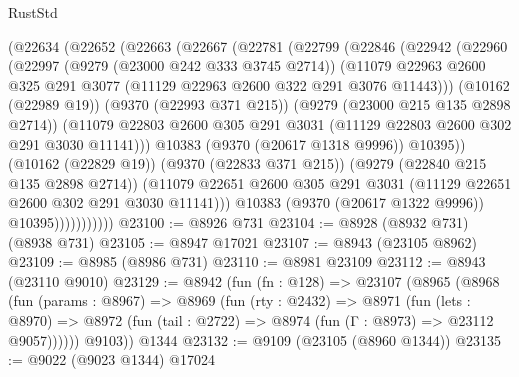 \begin{lexlean}{RustStd}
\begin{coremodule}
{\begin{coremodule}
{{{{{{{{{{{{{{{{{{{{{{{{{{{{{{{{{{{{{{{                (@22634
                  (@22652
                    (@22663
                      (@22667
                        (@22781
                          (@22799
                            (@22846
                              (@22942
                                (@22960
                                  (@22997
                                    (@9279 (@23000 @242 @333 @3745 @2714))
                                    (@11079
                                      @22963
                                      @2600
                                      @325
                                      @291
                                      @3077
                                      (@11129 @22963 @2600 @322 @291 @3076 @11443)))
                                  (@10162 (@22989 @19))
                                  (@9370 (@22993 @371 @215))
                                  (@9279 (@23000 @215 @135 @2898 @2714))
                                  (@11079
                                    @22803
                                    @2600
                                    @305
                                    @291
                                    @3031
                                    (@11129 @22803 @2600 @302 @291 @3030 @11141)))
                                @10383
                                (@9370 (@20617 @1318 @9996))
                                @10395))
                            (@10162 (@22829 @19))
                            (@9370 (@22833 @371 @215))
                            (@9279 (@22840 @215 @135 @2898 @2714))
                            (@11079
                              @22651
                              @2600
                              @305
                              @291
                              @3031
                              (@11129 @22651 @2600 @302 @291 @3030 @11141)))
                          @10383
                          (@9370 (@20617 @1322 @9996))
                          @10395)))))))))))
@23100 := @8926 @731
@23104 := @8928 (@8932 @731) (@8938 @731)
@23105 := @8947 @17021
@23107 := @8943 (@23105 @8962)
@23109 := @8985 (@8986 @731)
@23110 := @8981 @23109
@23112 := @8943 (@23110 @9010)
@23129 := @8942
    (fun (fn : @128) =>
    @23107
      (@8965
        (@8968
          (fun (params : @8967) =>
          @8969
            (fun (rty : @2432) =>
            @8971
              (fun (lets : @8970) =>
              @8972 (fun (tail : @2722) => @8974 (fun (Γ : @8973) => @23112 @9057))))))
        @9103))
    @1344
@23132 := @9109 (@23105 (@8960 @1344))
@23135 := @9022 (@9023 @1344) @17024
}}}}}}}}}}}}}}}}}}}}}}}}}}}}}}}}}}}}}}}
\end{coremodule}}
\end{coremodule}
\end{lexlean}
